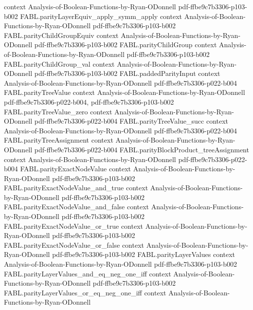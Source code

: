 \begin{theorem}
  {context}
  {Analysis-of-Boolean-Functions-by-Ryan-ODonnell}
  {pdf-ffbe9c7b3306-p103-b002}
\proofstep
  {FABL.parityLayerEquiv_apply_symm_apply}
  {context}
  {Analysis-of-Boolean-Functions-by-Ryan-ODonnell}
  {pdf-ffbe9c7b3306-p103-b002}
\proofstep
  {FABL.parityChildGroupEquiv}
  {context}
  {Analysis-of-Boolean-Functions-by-Ryan-ODonnell}
  {pdf-ffbe9c7b3306-p103-b002}
\proofstep
  {FABL.parityChildGroup}
  {context}
  {Analysis-of-Boolean-Functions-by-Ryan-ODonnell}
  {pdf-ffbe9c7b3306-p103-b002}
\proofstep
  {FABL.parityChildGroup_val}
  {context}
  {Analysis-of-Boolean-Functions-by-Ryan-ODonnell}
  {pdf-ffbe9c7b3306-p103-b002}
\proofstep
  {FABL.paddedParityInput}
  {context}
  {Analysis-of-Boolean-Functions-by-Ryan-ODonnell}
  {pdf-ffbe9c7b3306-p022-b004}
\proofstep
  {FABL.parityTreeValue}
  {context}
  {Analysis-of-Boolean-Functions-by-Ryan-ODonnell}
  {pdf-ffbe9c7b3306-p022-b004,
    pdf-ffbe9c7b3306-p103-b002}
\proofstep
  {FABL.parityTreeValue_zero}
  {context}
  {Analysis-of-Boolean-Functions-by-Ryan-ODonnell}
  {pdf-ffbe9c7b3306-p022-b004}
\proofstep
  {FABL.parityTreeValue_succ}
  {context}
  {Analysis-of-Boolean-Functions-by-Ryan-ODonnell}
  {pdf-ffbe9c7b3306-p022-b004}
\proofstep
  {FABL.parityTreeAssignment}
  {context}
  {Analysis-of-Boolean-Functions-by-Ryan-ODonnell}
  {pdf-ffbe9c7b3306-p022-b004}
\proofstep
  {FABL.parityBlockProduct_treeAssignment}
  {context}
  {Analysis-of-Boolean-Functions-by-Ryan-ODonnell}
  {pdf-ffbe9c7b3306-p022-b004}
\proofstep
  {FABL.parityExactNodeValue}
  {context}
  {Analysis-of-Boolean-Functions-by-Ryan-ODonnell}
  {pdf-ffbe9c7b3306-p103-b002}
\proofstep
  {FABL.parityExactNodeValue_and_true}
  {context}
  {Analysis-of-Boolean-Functions-by-Ryan-ODonnell}
  {pdf-ffbe9c7b3306-p103-b002}
\proofstep
  {FABL.parityExactNodeValue_and_false}
  {context}
  {Analysis-of-Boolean-Functions-by-Ryan-ODonnell}
  {pdf-ffbe9c7b3306-p103-b002}
\proofstep
  {FABL.parityExactNodeValue_or_true}
  {context}
  {Analysis-of-Boolean-Functions-by-Ryan-ODonnell}
  {pdf-ffbe9c7b3306-p103-b002}
\proofstep
  {FABL.parityExactNodeValue_or_false}
  {context}
  {Analysis-of-Boolean-Functions-by-Ryan-ODonnell}
  {pdf-ffbe9c7b3306-p103-b002}
\proofstep
  {FABL.parityLayerValues}
  {context}
  {Analysis-of-Boolean-Functions-by-Ryan-ODonnell}
  {pdf-ffbe9c7b3306-p103-b002}
\proofstep
  {FABL.parityLayerValues_and_eq_neg_one_iff}
  {context}
  {Analysis-of-Boolean-Functions-by-Ryan-ODonnell}
  {pdf-ffbe9c7b3306-p103-b002}
\proofstep
  {FABL.parityLayerValues_or_eq_neg_one_iff}
  {context}
  {Analysis-of-Boolean-Functions-by-Ryan-ODonnell}

\end{theorem}
